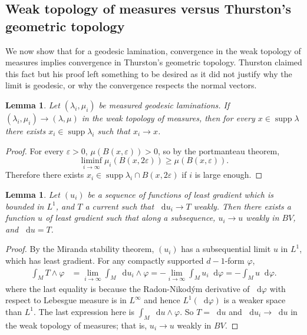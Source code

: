 \documentclass[reqno,11pt]{amsart}
\newcommand*\dif{\mathop{}\!\mathrm{d}}
\DeclareMathOperator{\supp}{supp}
\newtheorem{lemma}[theorem]{Lemma}
\theoremstyle{definition}
\numberwithin{equation}{section}
\begin{document}
\subsection{Weak topology of measures versus Thurston's geometric topology}
We now show that for a geodesic lamination, convergence in the weak topology of measures implies convergence in Thurston's geometric topology.
Thurston claimed this fact \cite[Proposition 8.10.3]{thurston1979geometry} but his proof left something to be desired as it did not justify why the limit is geodesic, or why the convergence respects the normal vectors.

\begin{lemma}\label{measured limits are almost thurston}
Let $(\lambda_i, \mu_i)$ be measured geodesic laminations.
If $(\lambda_i, \mu_i) \to (\lambda, \mu)$ in the weak topology of measures, then for every $x \in \supp \lambda$ there exists $x_i \in \supp \lambda_i$ such that $x_i \to x$.
\end{lemma}
\begin{proof}
For every $\varepsilon > 0$, $\mu(B(x, \varepsilon)) > 0$, so by the portmanteau theorem,
$$\liminf_{i \to \infty} \mu_i(B(x, 2\varepsilon)) \geq \mu(B(x, \varepsilon)).$$
Therefore there exists $x_i \in \supp \lambda_i \cap B(x, 2\varepsilon)$ if $i$ is large enough.
\end{proof}

\begin{lemma}\label{weak convergence of FLG}
Let $(u_i)$ be a sequence of functions of least gradient which is bounded in $L^1$, and $T$ a current such that $\dif u_i \to T$ weakly.
Then there exists a function $u$ of least gradient such that along a subsequence, $u_i \to u$ weakly in $BV$, and $\dif u = T$.
\end{lemma}
\begin{proof}
By the Miranda stability theorem, $(u_i)$ has a subsequential limit $u$ in $L^1$, which has least gradient.
For any compactly supported $d-1$-form $\varphi$,
\begin{align*}
\int_M T \wedge \varphi
&= \lim_{i \to \infty} \int_M \dif u_i \wedge \varphi
= -\lim_{i \to \infty} \int_M u_i \dif \varphi = - \int_M u \dif \varphi.
\end{align*}
where the last equality is because the Radon-Nikod\'ym derivative of $\dif \varphi$ with respect to Lebesgue measure is in $L^\infty$ and hence $L^1(\dif \varphi)$ is a weaker space than $L^1$. The last expression here is $\int_M \dif u \wedge \varphi$.
So $T = \dif u$ and $\dif u_i \to \dif u$ in the weak topology of measures; that is, $u_i \to u$ weakly in $BV$.
\end{proof}
\end{document}

